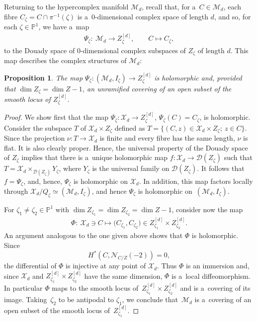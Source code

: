 \documentclass[pdftex]{sigma}
\numberwithin{equation}{section}
\newtheorem{Proposition}[Theorem]{Proposition}
{\theoremstyle{definition}
\newtheorem{Definition}[Theorem]{Definition}
\newtheorem{Remark}[Theorem]{Remark}
}
\begin{document}
Returning to the hypercomplex manifold ${\mathcal{M}}_d$, recall that, for a~$C\in {\mathcal{M}}_d$, each f\/ibre
$C_\zeta=C\cap \pi^{-1}(\zeta)$ is a~$0$-dimensional complex space of length $d$, and so, for each $\zeta\in
{\mathbb{P}}^1$, we have a~map
\begin{gather*}
\Psi_\zeta: \ {\mathcal{M}}_d\to Z_{\zeta}^{[d]},
\qquad
C\mapsto C_\zeta,
\end{gather*}
to the Douady space of $0$-dimensional complex subspaces of $Z_\zeta$ of length $d$.
This map describes the complex structures of ${\mathcal{M}}_d$:
\begin{Proposition}\label{Hilb}
The map $\Psi_\zeta:({\mathcal{M}}_d,I_\zeta)\to Z_{\zeta}^{[d]} $ is holomorphic and, provided that $\dim Z_\zeta=\dim
Z-1$, an unramified covering of an open subset of the smooth locus of $Z_{\zeta}^{[d]}$.
\end{Proposition}

\begin{proof}
We show f\/irst that the map $\Psi_\zeta:{\mathcal{X}}_d\to Z_{\zeta}^{[d]}$, $\Psi_\zeta(C)= C_{\zeta}$, is holomorphic.
Consider the subspace $T$ of ${\mathcal{X}}_d\times Z_{\zeta}$ def\/ined as
$
T=\{(C,z)\in {\mathcal{X}}_d\times Z_{\zeta};\: z\in C\}$.
Since the projection $\nu:T\to {\mathcal{X}}_d$ is f\/inite
and every f\/ibre has the same length, $\nu$ is f\/lat.
It is also clearly proper.
Hence, the universal property of the Douady space of $Z_{\zeta}$ implies that there is a~unique holomorphic map
$f:{\mathcal{X}}_d\to {\mathcal{D}}(Z_{\zeta})$ such that $T={\mathcal{X}}_d\times_{{\mathcal{D}}(Z_{\zeta})}Y_\zeta$,
where $Y_\zeta$ is the universal family on ${\mathcal{D}}(Z_\zeta)$.
It follows that $f=\Psi_\zeta$, and, hence, $\Psi_\zeta$ is holomorphic on ${\mathcal{X}}_d$.
In addition, this map factors locally through ${\mathcal{X}}_d/Q_\zeta\simeq ({\mathcal{M}}_d,I_\zeta)$, and hence
$\Psi_\zeta$ is holomorphic on~$({\mathcal{M}}_d,I_\zeta)$.

 For $\zeta_1\neq\zeta_2\in {\mathbb{P}}^1$ with $\dim Z_{\zeta_1}=\dim Z_{\zeta_2}=\dim Z-1$, consider now the map
\begin{gather*}
\Phi: \ {\mathcal{X}}_d\ni C\mapsto \bigl( C_{\zeta_1}, C_{\zeta_2}\bigr)\in Z_{\zeta_1}^{[d]}\times Z_{\zeta_2}^{[d]}.
\end{gather*}
An argument analogous to the one given above shows that $\Phi$ is holomorphic.
Since
\[
H^\ast(C,{\mathcal{N}}_{C/Z}(-2))=0,
\]
the dif\/ferential of $\Phi$ is injective at any point of ${\mathcal{X}}_d$.
Thus $\Phi$ is an immersion and, since ${\mathcal{X}}_d$ and $ Z_{\zeta_1}^{[d]}\times Z_{\zeta_2}^{[d]}$ have the same
dimension, $\Phi$ is a~local dif\/feomorphism.
In particular $\Phi$ maps to the smooth locus of~$ Z_{\zeta_1}^{[d]}\times Z_{\zeta_2}^{[d]}$ and is a~covering of its
image.
Taking~$\zeta_2$ to be antipodal to $\zeta_1$, we conclude that~${\mathcal{M}}_d$ is a~covering of an open subset of the
smooth locus of~$ Z_{\zeta_1}^{[d]}$.
\end{proof}
\end{document}
